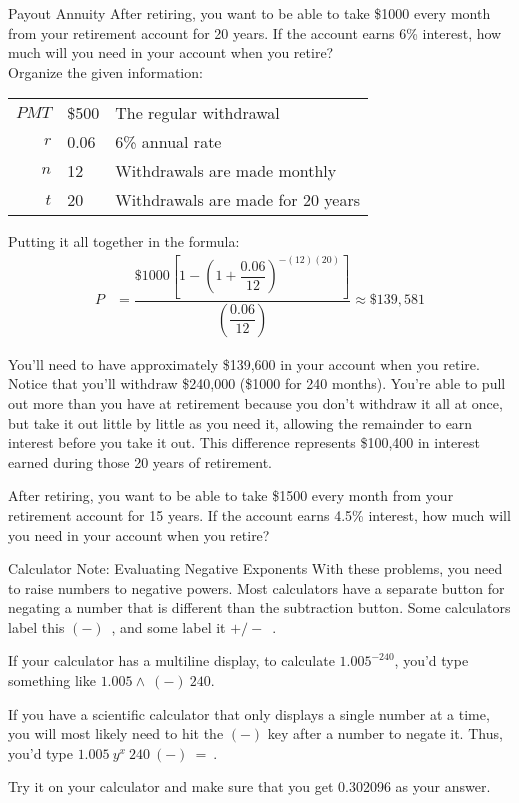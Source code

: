 \begin{example}[https://www.youtube.com/watch?v=A2pKYPSXUbw]{Payout Annuity}
After retiring, you want to be able to take \$1000 every month from your retirement account for 20 years.  If the account earns 6\% interest, how much will you need in your account when you retire?\\

Organize the given information:
\begin{center}
\begin{tabular}{r l l}
$PMT$ & \$500 & The regular withdrawal\\
$r$ & 0.06 & 6\% annual rate\\
$n$ & 12 & Withdrawals are made monthly\\
$t$ & 20 & Withdrawals are made for 20 years
\end{tabular}
\end{center}

Putting it all together in the formula:
\begin{align*}
P &= \dfrac{\$1000\left[1-\left(1+\dfrac{0.06}{12}\right)^{-(12)(20)}\right]}{\left(\dfrac{0.06}{12}\right)} \approx \$139,581
\end{align*}

You'll need to have approximately \$139,600 in your account when you retire.  Notice that you'll withdraw \$240,000 (\$1000 for 240 months).  You're able to pull out more than you have at retirement because you don't withdraw it all at once, but take it out little by little as you need it, allowing the remainder to earn interest before you take it out.  This difference represents \$100,400 in interest earned during those 20 years of retirement.
\end{example}

\begin{try}
After retiring, you want to be able to take \$1500 every month from your retirement account for 15 years.  If the account earns 4.5\% interest, how much will you need in your account when you retire?
\end{try}

\begin{proc}{Calculator Note: Evaluating Negative Exponents}
With these problems, you need to raise numbers to negative powers.  Most calculators have a separate button for negating a number that is different than the subtraction button.  Some calculators label this $\boxed{(-)}$\ , and some label it $\boxed{+/-}$\ .

If your calculator has a multiline display, to calculate $1.005^{-240}$, you'd type something like $1.005 \boxed{\wedge}\ \boxed{(-)}\ 240$.

If you have a scientific calculator that only displays a single number at a time, you will most likely need to hit the $\boxed{(-)}$ key after a number to negate it.  Thus, you'd type $1.005\ \boxed{y^x}\ 240\ \boxed{(-)}\ \boxed{=}\ $.

Try it on your calculator and make sure that you get 0.302096 as your answer.
\end{proc}

